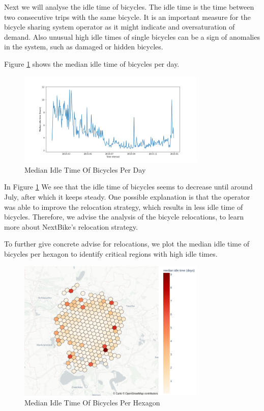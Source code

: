 Next we will analyse the idle time of bicycles. The idle time is the time
between two consecutive trips with the same bicycle. It is an important measure
for the bicycle sharing system operator as it might indicate and oversaturation
of demand. Also unusual high idle times of single bicycles can be a sign of
anomalies in the system, such as damaged or hidden bicycles.


Figure \ref{fig:descriptive_analysis_idle_time_daily} shows the median idle time of bicycles per day.
\begin{figure}[htb]
    \centering
    \includegraphics[width=0.8\textwidth]{Figures/descriptive_analysis/idle_time_daily.png}
    \caption{Median Idle Time Of Bicycles Per Day}
    \label{fig:descriptive_analysis_idle_time_daily}
\end{figure}

In Figure \ref{fig:descriptive_analysis_idle_time_daily} We see that the idle time of bicycles seems to decrease until around July, after which it keeps steady.
One possible explanation is that the operator was able to improve the relocation
strategy, which results in less idle time of bicycles.
Therefore, we advise the analysis of the bicycle relocations, to learn more about
NextBike's relocation strategy.

To further give concrete advise for relocations, we plot the median idle time
of bicycles per hexagon to identify critical regions with high idle times.

\begin{figure}[htb]
    \centering
    \includegraphics[width=0.8\textwidth]{Figures/descriptive_analysis/ide_time_hexagon.png}
    \caption{Median Idle Time Of Bicycles Per Hexagon}
    \label{fig:descriptive_analysis_idle_time_hexagon}
\end{figure}

